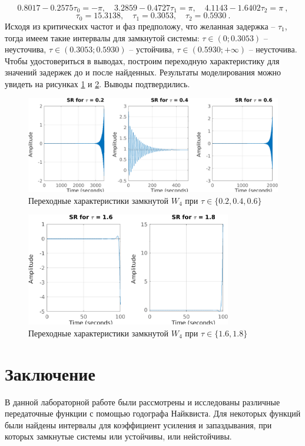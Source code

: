 \begin{equation*}
    0.8017-0.2575\tau_0=-\pi,\quad
    3.2859-0.4727\tau_1=\pi,\quad
    4.1143-1.6402\tau_2=\pi\ ,
\end{equation*}
\begin{equation*}
    \tau_0=15.3138,\quad\tau_1=0.3053,\quad\tau_2=0.5930\ .
\end{equation*}
Исходя из критических частот и фаз предположу, что желанная задержка -- $\tau_1$,
тогда имеем такие интервалы для замкнутой системы: $\tau\in(0;0.3053)$ -- 
неусточива, $\tau\in(0.3053;0.5930)$ -- устойчива, $\tau\in(0.5930; +\infty)$ -- неусточива.
Чтобы удостовериться в выводах, построим переходную характеристику для
значений задержек до и после найденных. Результаты моделирования можно
увидеть на рисунках \ref{fig:W41_steps} и \ref{fig:W42_steps}. Выводы подтвердились.

\begin{figure}[H]
    \centering
    \includegraphics[width=\textwidth]{figs/task_3_W4_1_tausteps.png}
    \caption{Переходные характеристики замкнутой $W_4$ при $\tau\in\{0.2,0.4,0.6\}$}
    \label{fig:W41_steps}
\end{figure}

\begin{figure}[H]
    \centering
    \includegraphics[width=0.8\textwidth]{figs/task_3_W4_2_tausteps.png}
    \caption{Переходные характеристики замкнутой $W_4$ при $\tau\in\{1.6,1.8\}$}
    \label{fig:W42_steps}
\end{figure}


\newpage
\section{Заключение}

В данной лабораторной работе были рассмотрены и исследованы 
различные передаточные функции с помощью годографа Найквиста.
Для некоторых функций были найдены интервалы для коэффициент 
усиления и запаздывания, при которых замкнутые системы или устойчивы, или
нейстойчивы.